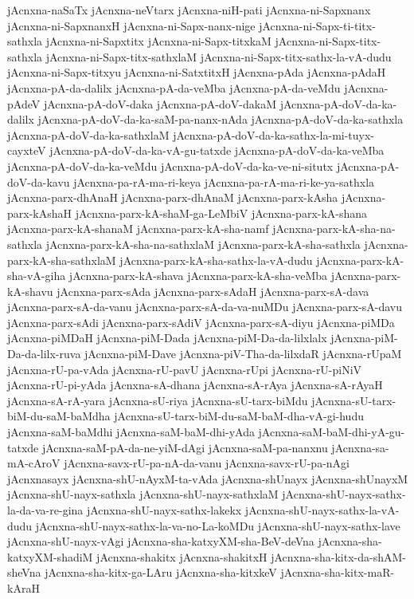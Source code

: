 {jAcnxna-naSaTx
jAcnxna-neVtarx
jAcnxna-niH-pati
jAcnxna-ni-Sapxnanx
jAcnxna-ni-SapxnanxH
jAcnxna-ni-Sapx-nanx-nige
jAcnxna-ni-Sapx-ti-titx-sathxla
jAcnxna-ni-Sapxtitx
jAcnxna-ni-Sapx-titxkaM
jAcnxna-ni-Sapx-titx-sathxla
jAcnxna-ni-Sapx-titx-sathxlaM
jAcnxna-ni-Sapx-titx-sathx-la-vA-dudu
jAcnxna-ni-Sapx-titxyu
jAcnxna-ni-SatxtitxH
jAcnxna-pAda
jAcnxna-pAdaH
jAcnxna-pA-da-dalilx
jAcnxna-pA-da-veMba
jAcnxna-pA-da-veMdu
jAcnxna-pAdeV
jAcnxna-pA-doV-daka
jAcnxna-pA-doV-dakaM
jAcnxna-pA-doV-da-ka-dalilx
jAcnxna-pA-doV-da-ka-saM-pa-nanx-nAda
jAcnxna-pA-doV-da-ka-sathxla
jAcnxna-pA-doV-da-ka-sathxlaM
jAcnxna-pA-doV-da-ka-sathx-la-mi-tuyx-cayxteV
jAcnxna-pA-doV-da-ka-vA-gu-tatxde
jAcnxna-pA-doV-da-ka-veMba
jAcnxna-pA-doV-da-ka-veMdu
jAcnxna-pA-doV-da-ka-ve-ni-situtx
jAcnxna-pA-doV-da-kavu
jAcnxna-pa-rA-ma-ri-keya
jAcnxna-pa-rA-ma-ri-ke-ya-sathxla
jAcnxna-parx-dhAnaH
jAcnxna-parx-dhAnaM
jAcnxna-parx-kAsha
jAcnxna-parx-kAshaH
jAcnxna-parx-kA-shaM-ga-LeMbiV
jAcnxna-parx-kA-shana
jAcnxna-parx-kA-shanaM
jAcnxna-parx-kA-sha-namf
jAcnxna-parx-kA-sha-na-sathxla
jAcnxna-parx-kA-sha-na-sathxlaM
jAcnxna-parx-kA-sha-sathxla
jAcnxna-parx-kA-sha-sathxlaM
jAcnxna-parx-kA-sha-sathx-la-vA-dudu
jAcnxna-parx-kA-sha-vA-giha
jAcnxna-parx-kA-shava
jAcnxna-parx-kA-sha-veMba
jAcnxna-parx-kA-shavu
jAcnxna-parx-sAda
jAcnxna-parx-sAdaH
jAcnxna-parx-sA-dava
jAcnxna-parx-sA-da-vanu
jAcnxna-parx-sA-da-va-nuMDu
jAcnxna-parx-sA-davu
jAcnxna-parx-sAdi
jAcnxna-parx-sAdiV
jAcnxna-parx-sA-diyu
jAcnxna-piMDa
jAcnxna-piMDaH
jAcnxna-piM-Dada
jAcnxna-piM-Da-da-lilxlalx
jAcnxna-piM-Da-da-lilx-ruva
jAcnxna-piM-Dave
jAcnxna-piV-Tha-da-lilxdaR
jAcnxna-rUpaM
jAcnxna-rU-pa-vAda
jAcnxna-rU-pavU
jAcnxna-rUpi
jAcnxna-rU-piNiV
jAcnxna-rU-pi-yAda
jAcnxna-sA-dhana
jAcnxna-sA-rAya
jAcnxna-sA-rAyaH
jAcnxna-sA-rA-yara
jAcnxna-sU-riya
jAcnxna-sU-tarx-biMdu
jAcnxna-sU-tarx-biM-du-saM-baMdha
jAcnxna-sU-tarx-biM-du-saM-baM-dha-vA-gi-hudu
jAcnxna-saM-baMdhi
jAcnxna-saM-baM-dhi-yAda
jAcnxna-saM-baM-dhi-yA-gu-tatxde
jAcnxna-saM-pA-da-ne-yiM-dAgi
jAcnxna-saM-pa-nanxnu
jAcnxna-sa-mA-cAroV
jAcnxna-savx-rU-pa-nA-da-vanu
jAcnxna-savx-rU-pa-nAgi
jAcnxnasayx
jAcnxna-shU-nAyxM-ta-vAda
jAcnxna-shUnayx
jAcnxna-shUnayxM
jAcnxna-shU-nayx-sathxla
jAcnxna-shU-nayx-sathxlaM
jAcnxna-shU-nayx-sathx-la-da-va-re-gina
jAcnxna-shU-nayx-sathx-lakekx
jAcnxna-shU-nayx-sathx-la-vA-dudu
jAcnxna-shU-nayx-sathx-la-va-no-La-koMDu
jAcnxna-shU-nayx-sathx-lave
jAcnxna-shU-nayx-vAgi
jAcnxna-sha-katxyXM-sha-BeV-deVna
jAcnxna-sha-katxyXM-shadiM
jAcnxna-shakitx
jAcnxna-shakitxH
jAcnxna-sha-kitx-da-shAM-sheVna
jAcnxna-sha-kitx-ga-LAru
jAcnxna-sha-kitxkeV
jAcnxna-sha-kitx-maR-kAraH
}
